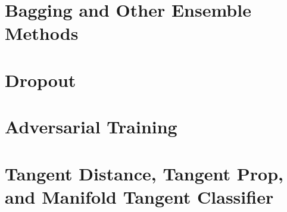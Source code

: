 \documentclass{article}
\begin{document}
\section{Bagging and Other Ensemble Methods}

\section{Dropout}

\section{Adversarial Training}

\section{Tangent Distance, Tangent Prop, and Manifold Tangent Classifier}





\end{document}

